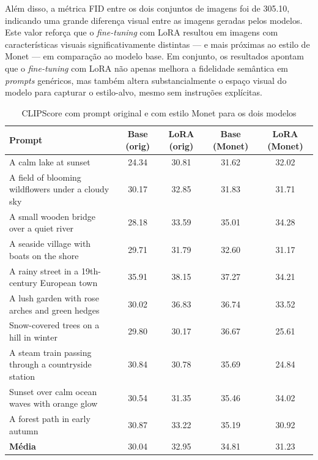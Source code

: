 Além disso, a métrica FID entre os dois conjuntos de imagens foi de 305.10, indicando uma grande diferença visual entre as imagens geradas pelos modelos. Este valor reforça que o \textit{fine-tuning} com LoRA resultou em imagens com características visuais significativamente distintas — e mais próximas ao estilo de Monet — em comparação ao modelo base. Em conjunto, os resultados apontam que o \textit{fine-tuning} com LoRA não apenas melhora a fidelidade semântica em \textit{prompts} genéricos, mas também altera substancialmente o espaço visual do modelo para capturar o estilo-alvo, mesmo sem instruções explícitas.

\begin{table}[htb]
\caption{CLIPScore com prompt original e com estilo Monet para os dois modelos}
\centering
\begin{tabular}{p{4.5cm}cccc}
\toprule
\textbf{Prompt} & \textbf{Base (orig)} & \textbf{LoRA (orig)} & \textbf{Base (Monet)} & \textbf{LoRA (Monet)} \\
\midrule
A calm lake at sunset & 24.34 & 30.81 & 31.62 & 32.02 \\
A field of blooming wildflowers under a cloudy sky & 30.17 & 32.85 & 31.83 & 31.71 \\
A small wooden bridge over a quiet river & 28.18 & 33.59 & 35.01 & 34.28 \\
A seaside village with boats on the shore & 29.71 & 31.79 & 32.60 & 31.17 \\
A rainy street in a 19th-century European town & 35.91 & 38.15 & 37.27 & 34.21 \\
A lush garden with rose arches and green hedges & 30.02 & 36.83 & 36.74 & 33.52 \\
Snow-covered trees on a hill in winter & 29.80 & 30.17 & 36.67 & 25.61 \\
A steam train passing through a countryside station & 30.84 & 30.78 & 35.69 & 24.84 \\
Sunset over calm ocean waves with orange glow & 30.54 & 31.35 & 35.46 & 34.02 \\
A forest path in early autumn & 30.87 & 33.22 & 35.19 & 30.92 \\
\midrule
\textbf{Média} & 30.04 & 32.95 & 34.81 & 31.23 \\
\bottomrule
\end{tabular}
\label{tab:clipscore_duplo}
\end{table}

